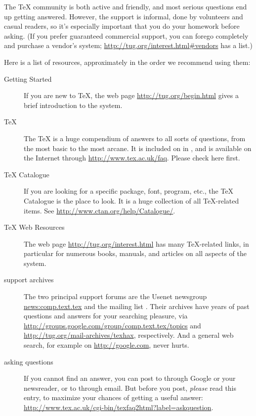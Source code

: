 \documentclass{article}
\begin{document}
The \TeX{} community is both active and friendly, and most serious
questions end up getting answered.  However, the support is informal,
done by volunteers and casual readers, so it's especially important that
you do your homework before asking.  (If you prefer guaranteed
commercial support, you can forego \TL{} completely and purchase a
vendor's system; \url{http://tug.org/interest.html#vendors} has a list.)

Here is a list of resources, approximately in the order we recommend
using them:

\begin{description}
\item [Getting Started] If you are new to \TeX, the web page
\url{http://tug.org/begin.html} gives a brief introduction to the system.

\item [\TeX{} ] The \TeX{}  is a huge compendium
  of answers to all sorts of questions, from the most basic to the
  most arcane.  It is included on \TL{} in
  , and is available
  on the Internet through \url{http://www.tex.ac.uk/faq}.  Please
  check here first.

\item [\TeX{} Catalogue] If you are looking for a specific package,
font, program, etc., the \TeX{} Catalogue is the place to look.  It is a
huge collection of all \TeX{}-related items.  See
\url{http://www.ctan.org/help/Catalogue/}.

\item [\TeX{} Web Resources] The web page
\url{http://tug.org/interest.html} has many \TeX{}-related links, in
particular for numerous books, manuals, and articles on all aspects of
the system.

\item [support archives] The two principal support forums are the
Usenet newsgroup \url{news:comp.text.tex} and the mailing list
.  Their archives have years of past
questions and answers for your searching pleasure, via
\url{http://groups.google.com/group/comp.text.tex/topics} and
\url{http://tug.org/mail-archives/texhax}, respectively.  And a general web
search, for example on \url{http://google.com}, never hurts.

\item [asking questions] If you cannot find an answer, you can post to
 through Google or your newsreader, or to
 through email.  But before you post,
\emph{please} read this  entry, to maximize 
your chances of getting a useful answer:
\url{http://www.tex.ac.uk/cgi-bin/texfaq2html?label=askquestion}.


\end{description}
\end{document}
